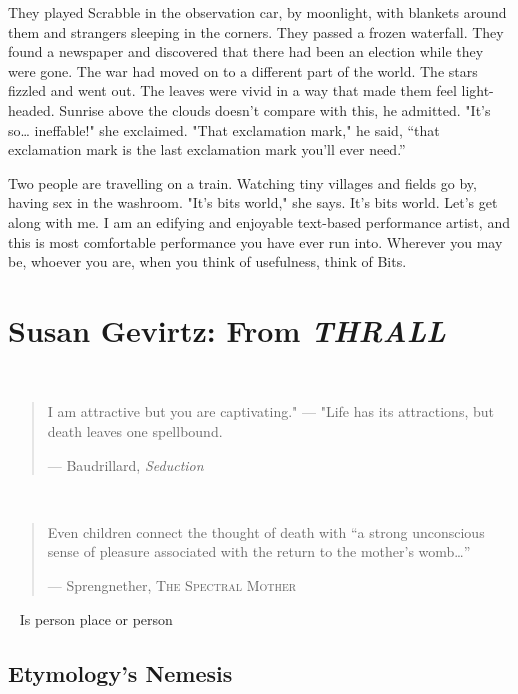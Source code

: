 \documentclass[
]{memoir}
\begin{document}
They played Scrabble in the observation car, by moonlight, with blankets
around them and strangers sleeping in the corners. They passed a frozen
waterfall. They found a newspaper and discovered that there had been an
election while they were gone. The war had moved on to a different part
of the world. The stars fizzled and went out. The leaves were vivid in a
way that made them feel light-headed. Sunrise above the clouds doesn't
compare with this, he admitted. "It's so\ldots{} ineffable!" she
exclaimed. "That exclamation mark," he said, ``that exclamation mark is
the last exclamation mark you'll ever need.''

Two people are travelling on a train. Watching tiny villages and fields
go by, having sex in the washroom. "It's bits world," she says. It's
bits world. Let's get along with me. I am an edifying and enjoyable
text-based performance artist, and this is most comfortable performance
you have ever run into. Wherever you may be, whoever you are, when you
think of usefulness, think of Bits.

\hypertarget{susan-gevirtz-from-thrall}{%
\chapter{\texorpdfstring{Susan Gevirtz: From
\emph{THRALL}}{Susan Gevirtz: From THRALL}}\label{susan-gevirtz-from-thrall}}

~

\begin{quote}
I am attractive but you are captivating." --- "Life has its attractions,
but death leaves one spellbound.

--- Baudrillard, \emph{Seduction}
\end{quote}

~

\begin{quote}
Even children connect the thought of death with ``a strong unconscious
sense of pleasure associated with the return to the mother's
womb\ldots{}''

--- Sprengnether, \textsc{The Spectral Mother}
\end{quote}

~ Is person place or person

\hypertarget{etymologys-nemesis}{%
\section*{Etymology's Nemesis}\label{etymologys-nemesis}}
\end{document}
